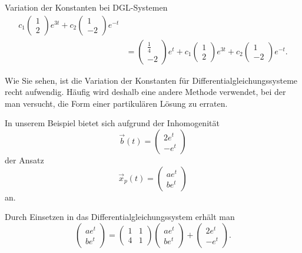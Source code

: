 \begin{bsp}{Variation der Konstanten bei DGL-Systemen}{}
\[\begin{aligned}
            c_1\begin{pmatrix}1\\2\end{pmatrix}e^{3t}
            +
            c_2\begin{pmatrix}1\\-2\end{pmatrix}e^{-t} \\[3mm]
             & =
            \boxed{
                \begin{pmatrix}
                    \frac14 \\-2
                \end{pmatrix}e^t
                +
                c_1\begin{pmatrix}1\\2\end{pmatrix}e^{3t}
                +
                c_2\begin{pmatrix}1\\-2\end{pmatrix}e^{-t}
            }.
        \end{aligned}
    \]

\end{bsp}

Wie Sie sehen, ist die Variation der Konstanten für
Differentialgleichungssysteme recht aufwendig. Häufig wird deshalb
eine andere Methode verwendet, bei der man versucht, die Form
einer partikulären Lösung zu erraten.

In unserem Beispiel bietet sich aufgrund der Inhomogenität
\[
    \vec b(t)=
    \begin{pmatrix}
        2e^t \\
        -e^t
    \end{pmatrix}
\]
der Ansatz
\[
    \vec x_p(t)=
    \begin{pmatrix}
        ae^t \\
        be^t
    \end{pmatrix}
\]
an.

Durch Einsetzen in das Differentialgleichungssystem erhält man
\[
    \begin{pmatrix}
        ae^t \\
        be^t
    \end{pmatrix}
    =
    \begin{pmatrix}
        1 & 1 \\
        4 & 1
    \end{pmatrix}
    \begin{pmatrix}
        ae^t \\
        be^t
    \end{pmatrix}
    +
    \begin{pmatrix}
        2e^t \\
        -e^t
    \end{pmatrix}.
\]

